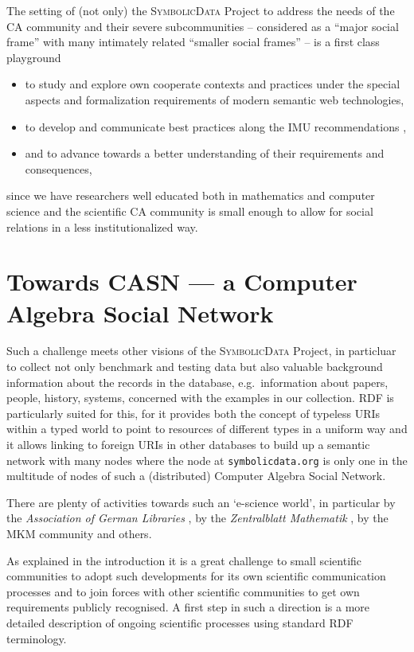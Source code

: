 \documentclass[a4paper,11pt]{article}
\def\Ueberschrift#1#2{\section{#1}}
\def\SD{\textsc{SymbolicData}}
\def\eg{e.g.\ }
\begin{document}
\begin{multicols}{2}
The setting of (not only) the {\SD} Project to address the needs of
the CA community and their severe subcommunities -- considered as a
``major social frame'' with many intimately related ``smaller social
frames'' -- is a first class playground
\begin{itemize}
\item to study and explore own cooperate contexts and practices under
  the special aspects and formalization requirements of modern
  semantic web technologies,
\item to develop and communicate best practices along the IMU
  recommendations \cite{PitmannLynch},
\item and to advance towards a better understanding of their
  requirements and consequences,
\end{itemize}
since we have researchers well educated both in mathematics and computer
science and the scientific CA community is small enough to allow for social
relations in a less institutionalized way.

\Ueberschrift{Towards CASN --- a Computer Algebra Social Network}{CASN}

Such a challenge meets other visions of the {\SD} Project, in particluar to
collect not only benchmark and testing data but also valuable background
information about the records in the database, \eg information about papers,
people, history, systems, concerned with the examples in our collection.  RDF
is particularly suited for this, for it provides both the concept of typeless
URIs within a typed world to point to resources of different types in a
uniform way and it allows linking to foreign URIs in other databases to build
up a semantic network with many nodes where the node at
\texttt{symbolicdata.org} is only one in the multitude of nodes of such a
(distributed) Computer Algebra Social Network.

There are plenty of activities towards such an `e-science world', in particular
by the \emph{Association of German Libraries} \cite{GND}, by the
\emph{Zentralblatt Mathematik} \cite{postagging}, by the MKM community
\cite{MKM} and others.

As explained in the introduction it is a great challenge to small scientific
communities to adopt such developments for its own scientific communication
processes and to join forces with other scientific communities to get own
requirements publicly recognised. A first step in such a direction is a more
detailed description of ongoing scientific processes using standard RDF
terminology. 


\end{multicols}
\end{document}
